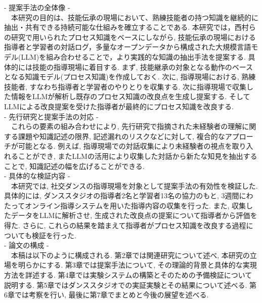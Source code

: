 - 提案手法の全体像 -\\
　本研究の目的は、技能伝承の現場において、熟練技能者の持つ知識を継続的に抽出・共有できる持続可能な仕組みを確立することである. 本研究では，西村らの研究\cite{Nishimura2017}で用いられたプロセス知識をベースにしながら, 技能伝承の現場における指導者と学習者の対話ログ，多量なオープンデータから構成された大規模言語モデル(LLM)を組み合わせることで，より実践的な知識の抽出手法を提案する. 具体的には技能の指導現場に着目する. まず, 技能継承の対象となる動作のベースとなる知識モデル(プロセス知識)を作成しておく. 次に, 指導現場における, 熟練技能者, すなわち指導者と学習者のやりとりを収集する. 次に指導現場で収集した情報をLLMが解析し既存のプロセス知識の改良点を生成し提案する. そしてLLMによる改良提案を受けた指導者が最終的にプロセス知識を改良する.\\

- 先行研究と提案手法の対応 -\\
　これらの要素の組み合わせにより, 先行研究で指摘された未経験者の理解に関する課題や知識記述の限界, 記述漏れのリスクなどに対して, 複合的なアプローチが可能となる. 例えば, 指導現場での対話収集により未経験者の視点を取り入れることができ, またLLMの活用により収集した対話から新たな知見を抽出することで, 知識記述の幅を広げることができる.\\

- 具体的な検証内容 -\\
　本研究では, 社交ダンスの指導現場を対象として提案手法の有効性を検証した. 具体的には, ダンススタジオの指導者2名と学習者13名の協力のもと, 3週間にわたってオンライン指導システムを用いた指導内容の収集を行った. また, 収集したデータをLLMに解析させ, 生成された改良点の提案について指導者から評価を得た. さらに, これらの結果を踏まえて指導者がプロセス知識を改良する過程についても検証を行った.\\

- 論文の構成 -\\
　本稿は以下のように構成される. 第2章では関連研究について述べ, 本研究の立場を明らかにする. 第3章では提案手法について, その理論的背景と具体的な実現方法を詳述する. 第4章では実験システムの構築とそのための予備検証について説明する. 第5章ではダンススタジオでの実証実験とその結果について述べる. 第6章では考察を行い, 最後に第7章でまとめと今後の展望を述べる.\\


